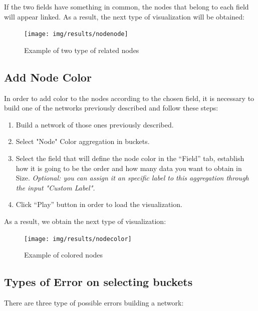 \documentclass[a4paper, 12pt]{book}
\begin{document}
If the two fields have something in common, the nodes that belong to each field will appear linked. As a result, the next type of visualization will be obtained:

\begin{figure}[H]
  \centering
  \texttt{[image: img/results/nodenode]}
  \caption{Example of two type of related nodes}
  \label{fig:nodenode}
\end{figure}

\subsection{Add Node Color}

In order to add color to the nodes according to the chosen field, it is necessary to build one of the networks previously described and follow these steps:

\begin{enumerate}
\item Build a network of those ones previously described.
\item Select "Node" Color aggregation in buckets.
\item Select the field that will define the node color in the “Field” tab, establish how it is going to be the order and how many data you want to obtain in Size. \textit{Optional: you can assign it an specific label to this aggregation through the input "Custom Label". }
\item Click “Play” button in order to load the visualization.
\end{enumerate}

As a result, we obtain the next type of visualization:

\begin{figure}[H]
  \centering
  \texttt{[image: img/results/nodecolor]}
  \caption{Example of colored nodes}
  \label{fig:nodecolor}
\end{figure}

\subsection{Types of Error on selecting buckets}

There are three type of possible errors building a network:
\end{document}
